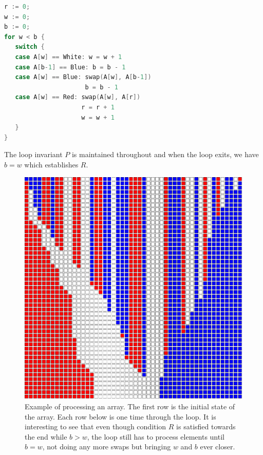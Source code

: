 \begin{lstlisting}[language=Go, frame=single]  
r := 0;
w := 0;
b := 0;
for w < b {
   switch {
   case A[w] == White: w = w + 1
   case A[b-1] == Blue: b = b - 1
   case A[w] == Blue: swap(A[w], A[b-1]) 
                      b = b - 1
   case A[w] == Red: swap(A[w], A[r])
                     r = r + 1
                     w = w + 1
   }
}          
\end{lstlisting}

The loop invariant $P$ is maintained throughout and when the loop exits, we have $b = w$ which establishes $R$.

\begin{figure}
\includegraphics[scale=0.5]{largerun.pdf}
\caption{Example of processing an array. The first row is the initial state of the array. Each row below is one time through the loop. It is interesting to see that even though condition $R$ is satisfied towards the end while $b > w$, the loop still has to process elements until $b = w$, not doing any more swaps but bringing $w$ and $b$ ever closer.}
\end{figure}


